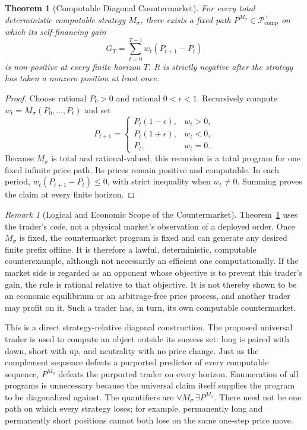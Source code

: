 \documentclass[aps,pra,reprint,superscriptaddress,amsmath,amssymb,floatfix]{revtex4-2}
\theoremstyle{plain}
\newtheorem{theorem}{Theorem}
\theoremstyle{definition}
\theoremstyle{remark}
\newtheorem{remark}{Remark}
\begin{document}
\begin{samepage}
\begin{theorem}[Computable Diagonal Countermarket]
  \label{thm:counterpath}
  For every total deterministic computable strategy \(M_\sigma\), there exists
  a fixed path \(P^{M_\sigma}\in\mathcal P_{\mathrm{comp}}^{+}\) on which its
  self-financing gain
  \[
    G_T=\sum_{t=0}^{T-1}w_t(P_{t+1}-P_t)
  \]
  is non-positive at every finite horizon \(T\). It is strictly negative after
  the strategy has taken a nonzero position at least once.
\end{theorem}
\end{samepage}

\begin{proof}
Choose rational \(P_0>0\) and rational \(0<\epsilon<1\). Recursively compute
\(w_t=M_\sigma(P_0,\ldots,P_t)\) and set
\begin{equation}
P_{t+1}=
\begin{cases}
P_t(1-\epsilon),&w_t>0,\\
P_t(1+\epsilon),&w_t<0,\\
P_t,&w_t=0.
\end{cases}
\label{eq:adversary}
\end{equation}
Because \(M_\sigma\) is total and rational-valued, this recursion is a total
program for one fixed infinite price path. Its prices remain positive and
computable. In each period,
\(w_t(P_{t+1}-P_t)\leq0\), with strict inequality when \(w_t\neq0\).
Summing proves the claim at every finite horizon.
\end{proof}

\begin{remark}[Logical and Economic Scope of the Countermarket]
\label{rem:counterpath-scope}
Theorem~\ref{thm:counterpath} uses the trader's \emph{code}, not a physical
market's observation of a deployed order. Once \(M_\sigma\) is fixed, the
countermarket program is fixed and can generate any desired finite prefix
offline. It is therefore a lawful, deterministic, computable counterexample,
although not necessarily an efficient one computationally. If the market side
is regarded as an opponent whose objective is to prevent this trader's gain,
the rule is rational relative to that objective. It is not thereby shown to be
an economic equilibrium or an arbitrage-free price process, and another trader
may profit on it. Such a trader has, in turn, its own computable countermarket.
\end{remark}

This is a direct strategy-relative diagonal construction. The proposed
universal trader is used to compute an object outside its success set: long is
paired with down, short with up, and neutrality with no price change. Just as
the complement sequence defeats a purported predictor of every computable
sequence, \(P^{M_\sigma}\) defeats the purported trader on every horizon.
Enumeration of all programs is unnecessary because the universal claim itself
supplies the program to be diagonalized against. The quantifiers are
\(\forall M_\sigma\,\exists P^{M_\sigma}\). There need not be one path on
which every strategy loses; for example, permanently long and permanently
short positions cannot both lose on the same one-step price move.
\end{document}
